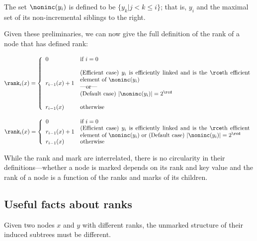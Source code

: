 The set $\noninc(y_i)$ is defined to be $\{ y_k | j<k \leq i\}$; that is, $y_i$ and the maximal set of its non-incremental siblings to the right.
\begin{fullonly}

\end{fullonly}
Given these preliminaries, we can now give the full definition of the rank of a node that has defined rank:
\begin{fullonly}
$$
\rank_i(x)=
\left\{
	\begin{array}{ll}
		0  & \mbox{if } i = 0 \\ \\
		r_{i-1}(x)+1 & \mbox{\parbox{4in}{(Efficient case) $y_i$ is efficiently linked and is the $\rce $th efficient element of $\noninc(y_i)$
		\\---or--- \\
		(Default case) $|\noninc(y_i)|=2^{\rcd} {}$}}\\ \\
		r_{i-1}(x) & \mbox{otherwise}
	\end{array}
\right.
$$
\end{fullonly}
\begin{shortonly}
$$
\rank_i(x)=
\left\{
	\begin{array}{ll}
		0  & \mbox{if } i = 0 \\ 
		r_{i-1}(x)+1 & \mbox{\parbox{4in}{(Efficient case) $y_i$ is efficiently linked and is the $\rce $th efficient element of $\noninc(y_i)$ or
		(Default case) $|\noninc(y_i)|=2^{\rcd} {}$}}\\ 
		r_{i-1}(x) & \mbox{otherwise}
	\end{array}
\right.
$$
\end{shortonly}
While the rank and mark are interrelated, there is no circularity in their definitions---whether a node is marked depends on its rank and key value and the rank of a node is a function of the ranks and marks of its children. 



\subsection{Useful facts about ranks}

\begin{obs}
Given two nodes $x$ and $y$ with different ranks, the unmarked structure of their induced subtrees must be different.
\end{obs}

